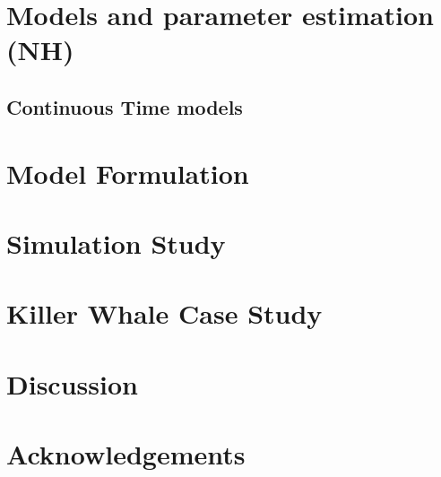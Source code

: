 \documentclass[12pt]{TD-CJS}
\begin{document}
%
%
\section{Models and parameter estimation (NH)}

%

%
%
\subsection{Continuous Time models}

%
\section{Model Formulation}

%
\section{Simulation Study}

%
\section{Killer Whale Case Study}

%
\section{Discussion}
%
%
\section{Acknowledgements}

\clearpage

\newcommand{\newblock}{}



\clearpage


\end{document}
